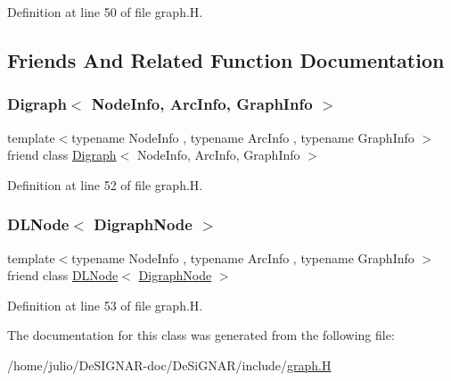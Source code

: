 Definition at line 50 of file graph.\+H.



\subsection{Friends And Related Function Documentation}
\mbox{\label{class_designar_1_1_digraph_node_abc8f370e4ec7084a6574cf967a5a5aaf}} 
\subsubsection{\texorpdfstring{Digraph$<$ Node\+Info, Arc\+Info, Graph\+Info $>$}{Digraph< NodeInfo, ArcInfo, GraphInfo >}}
{\footnotesize\ttfamily template$<$typename Node\+Info , typename Arc\+Info , typename Graph\+Info $>$ \\
friend class \hyperlink{class_designar_1_1_digraph}{Digraph}$<$ Node\+Info, Arc\+Info, Graph\+Info $>$\hspace{0.3cm}{\ttfamily [friend]}}



Definition at line 52 of file graph.\+H.

\mbox{\label{class_designar_1_1_digraph_node_a5532eb461a543edfe19acf97b74316fc}} 
\subsubsection{\texorpdfstring{D\+L\+Node$<$ Digraph\+Node $>$}{DLNode< DigraphNode >}}
{\footnotesize\ttfamily template$<$typename Node\+Info , typename Arc\+Info , typename Graph\+Info $>$ \\
friend class \hyperlink{class_designar_1_1_d_l_node}{D\+L\+Node}$<$ \hyperlink{class_designar_1_1_digraph_node}{Digraph\+Node} $>$\hspace{0.3cm}{\ttfamily [friend]}}



Definition at line 53 of file graph.\+H.



The documentation for this class was generated from the following file\+:\begin{DoxyCompactItemize}
\item 
/home/julio/\+De\+S\+I\+G\+N\+A\+R-\/doc/\+De\+Si\+G\+N\+A\+R/include/\hyperlink{graph_8_h}{graph.\+H}\end{DoxyCompactItemize}
